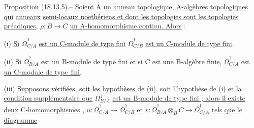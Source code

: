 \uline{Proposition} (18.13.5).-- \uline{Soient} A \uline{un anneau topologique},   \uline{A-algèbres topologiques qui}   \uline{anneaux}  \uline{semi-locaux noethériens et dont les topologies sont les topologies préadiques}, $\rho:B\to C$ \uline{un A-homomorphisme continu. Alors} :


(i) \uline{Si}  $\overline{\Omega}^1_{C/A}$ \uline{est un C-module de type fini}  $\overline{\Omega}^1_{C/B}$ \uline{est un C-module de type fini}.

(ii) \uline{Si} $\overline{\Omega}^1_{B/A}$ \uline{est un B-module de type fini et si} C \uline{est une B-algèbre finie}, $\overline{\Omega}^1_{C/A}$ \uline{est un C-module de type fini}.

(iii) \uline{Supposons vérifiées, soit les hypothèses de} (ii), \uline{soit}  \uline{l'hypothèse de} (i) \uline{et la condition supplémentaire que} $\Omega^1_{B/A}$ \uline{est un B-module de type fini ; alors il existe deux C-homomorphismes} , $\overline{u}:\overline{\Omega}^1_{C/A}\to\overline{\Omega}^1_{C/B}$ \uline{et} \deleted{\unsure{:}} $\overline{v}:\overline{\Omega}^1_{B/A}\otimes_B C\to\overline{\Omega}^1_{C/A}$ \uline{tels que le diagramme}



